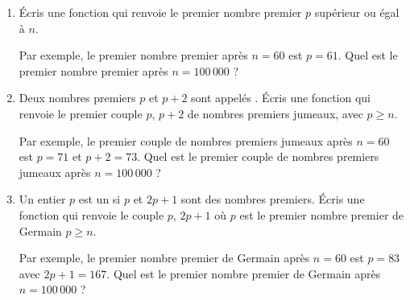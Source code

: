 \documentclass[11pt,class=report,crop=false]{standalone}
\begin{document}
\begin{activite}


\begin{enumerate}
  \item Écris une fonction  qui renvoie le premier nombre premier $p$ supérieur ou égal à $n$. 
  
  Par exemple, le premier nombre premier après $n=60$ est $p=61$. 
  Quel est le premier nombre premier après $n=100\,000$ ?
  
  \item Deux nombres premiers $p$ et $p+2$ sont appelés . Écris une fonction  qui renvoie le premier couple $p$, $p+2$ de nombres premiers jumeaux, avec $p \ge n$.
  
  Par exemple, le premier couple de nombres premiers jumeaux après $n=60$ est $p=71$ et $p+2=73$.   
    Quel est le premier couple de nombres premiers jumeaux après $n=100\,000$ ?
    
  \item Un entier $p$ est un  si $p$ et $2p+1$ sont des nombres premiers. Écris une fonction  qui renvoie le couple $p$, $2p+1$ où $p$ est le premier nombre premier de Germain $p \ge n$.
  
  Par exemple, le premier nombre premier de Germain après $n=60$ est $p=83$ avec $2p+1=167$.   
  Quel est le premier nombre premier de Germain après $n=100\,000$ ?
  
\end{enumerate}   
     
\end{activite}
\end{document}

